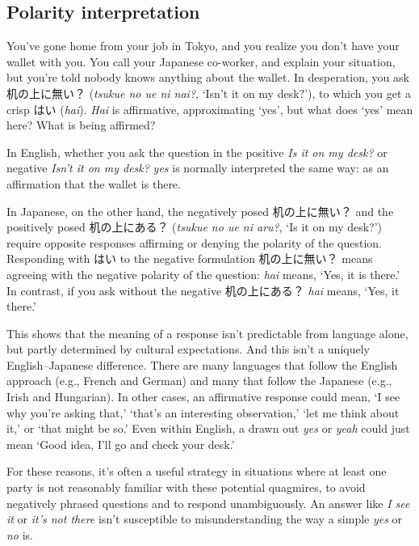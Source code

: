 \subsection{Polarity interpretation}

You've gone home from your job in Tokyo, and you realize you don't have your wallet with you. You call your Japanese co-worker, and explain your situation, but you're told nobody knows anything about the wallet. In desperation, you ask 机の上に無い？ (\textit{tsukue no ue ni nai?}, `Isn't it on my desk?'), to which you get a crisp {はい} (\textit{hai}). \textit{Hai} is affirmative, approximating `yes', but what does `yes' mean here? What is being affirmed?

In English, whether you ask the question in the positive \textit{Is it on my desk?} or negative \textit{Isn't it on my desk?} \textit{yes} is normally interpreted the same way: as an affirmation that the wallet is there. 

In Japanese, on the other hand, the negatively posed 机の上に無い？ and the positively posed 机の上にある？ (\textit{tsukue no ue ni aru?}, `Is it on my desk?') require opposite responses affirming or denying the polarity of the question. Responding with はい to the negative formulation 机の上に無い？ means agreeing with the negative polarity of the question: \textit{hai} means, `Yes, it is  there.' In contrast, if you ask without the negative 机の上にある？ \textit{hai} means, `Yes, it  there.'

This shows that the meaning of a response isn't predictable from language alone, but partly determined by cultural expectations. And this isn't a uniquely English--Japanese difference. There are many languages that follow the English approach (e.g., French and German) and many that follow the Japanese (e.g., Irish and Hungarian).
In other cases, an affirmative response could mean, `I see why you're asking that,' `that's an interesting observation,' `let me think about it,' or `that might be so.' Even within English, a drawn out \textit{yes} or \textit{yeah} could just mean `Good idea, I'll go and check your desk.'

For these reasons, it's often a useful strategy in situations where at least one party is not reasonably familiar with these potential quagmires, to avoid negatively phrased questions and to respond unambiguously. An answer like \textit{I see it} or \textit{it's not there} isn't susceptible to misunderstanding the way a simple \textit{yes} or \textit{no} is.


